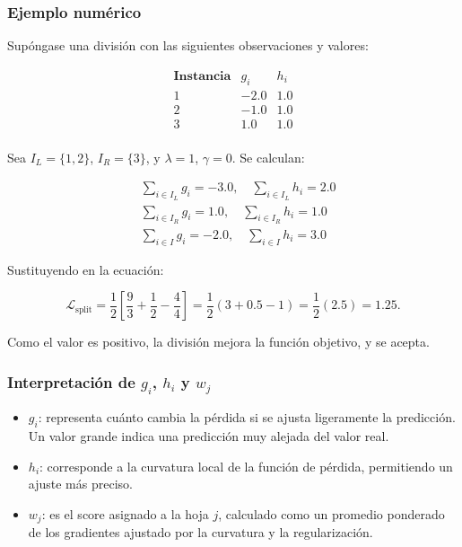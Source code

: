 \documentclass[12pt,letterpaper]{article}
\begin{document}
\subsubsection*{Ejemplo numérico}

Supóngase una división con las siguientes observaciones y valores:

\[
\begin{array}{ccc}
\textbf{Instancia} & g_i & h_i \\
\hline
1 & -2.0 & 1.0 \\
2 & -1.0 & 1.0 \\
3 & 1.0 & 1.0 \\
\end{array}
\]

Sea \( I_L = \{1, 2\} \), \( I_R = \{3\} \), y \( \lambda = 1 \), \( \gamma = 0 \). Se calculan:

\[
\begin{aligned}
&\sum_{i \in I_L} g_i = -3.0, \quad \sum_{i \in I_L} h_i = 2.0 \\
&\sum_{i \in I_R} g_i = 1.0, \quad \sum_{i \in I_R} h_i = 1.0 \\
&\sum_{i \in I} g_i = -2.0, \quad \sum_{i \in I} h_i = 3.0
\end{aligned}
\]

Sustituyendo en la ecuación:

\[
\mathcal{L}_{\text{split}} = \frac{1}{2} \left[ \frac{9}{3} + \frac{1}{2} - \frac{4}{4} \right] = \frac{1}{2}(3 + 0.5 - 1) = \frac{1}{2}(2.5) = 1.25.
\]

Como el valor es positivo, la división mejora la función objetivo, y se acepta.

\subsubsection{Interpretación de \( g_i \), \( h_i \) y \( w_j \)}

\begin{itemize}
    \item  \( g_i \): representa cuánto cambia la pérdida si se ajusta ligeramente la predicción. Un valor grande indica una predicción muy alejada del valor real.
    \item  \( h_i \): corresponde a la curvatura local de la función de pérdida, permitiendo un ajuste más preciso.
    \item  \( w_j \): es el score asignado a la hoja \( j \), calculado como un promedio ponderado de los gradientes ajustado por la curvatura y la regularización.
\end{itemize}
\end{document}

